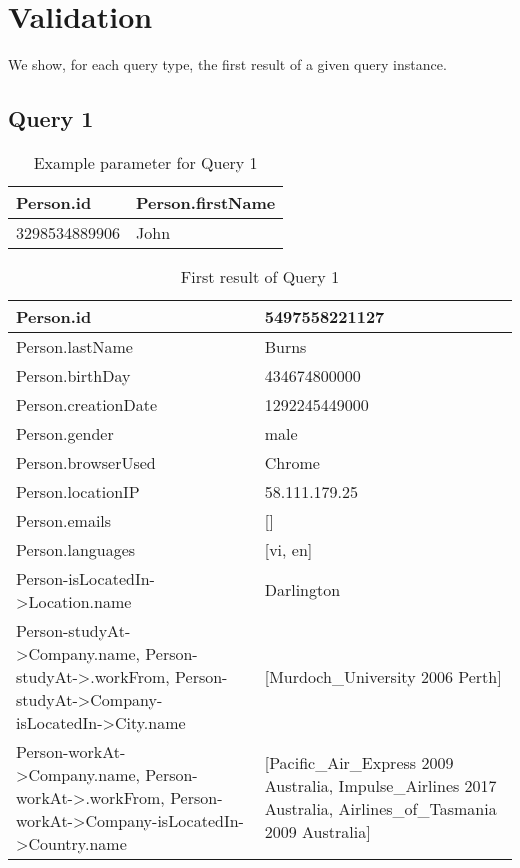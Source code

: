 \section{Validation}

We show, for each query type, the first result of a given query instance.
\subsection{Query 1}

\begin{table}[H]
    \begin{tabular}{|l|l|}
        \hline
        Person.id & Person.firstName \\
        \hline
        3298534889906 & John \\
        \hline
    \end{tabular}
    \caption{Example parameter for Query 1}
\end{table}

\begin{table}[H]
    \begin{tabular}{|p{8cm}|p{8cm}|}
        \hline
        Person.id & 5497558221127 \\
        \hline
        Person.lastName & Burns \\
        \hline
        Person.birthDay & 434674800000 \\
        \hline
        Person.creationDate & 1292245449000 \\
        \hline
        Person.gender & male \\
        \hline
        Person.browserUsed & Chrome \\
        \hline
        Person.locationIP & 58.111.179.25 \\ 
        \hline
        Person.emails & [] \\
        \hline
        Person.languages &  [vi, en] \\
        \hline
        Person-isLocatedIn->Location.name & Darlington \\
        \hline
        Person-studyAt->Company.name, \newline
        Person-studyAt->.workFrom, \newline 
        Person-studyAt->Company-isLocatedIn->City.name & [Murdoch\_University 2006 Perth] \\
        \hline
        Person-workAt->Company.name, \newline
        Person-workAt->.workFrom, \newline
        Person-workAt->Company-isLocatedIn->Country.name & [Pacific\_Air\_Express 2009 Australia, \newline Impulse\_Airlines 2017 Australia, \newline Airlines\_of\_Tasmania 2009 Australia] \\
        \hline
    \end{tabular}
    \caption{First result of Query 1}
\end{table}


